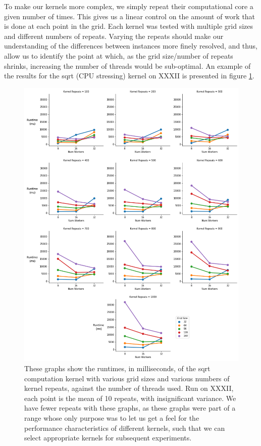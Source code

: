 To make our kernels more complex, we simply repeat their computational core a given number of times. This gives us a linear control on the amount of work that is done at each point in the grid. Each kernel was tested with multiple grid sizes and different numbers of repeats. Varying the repeats should make our understanding of the differences between instances more finely resolved, and thus, allow us to identify the point at which, as the grid size/number of repeats shrinks, increasing the number of threads would be sub-optimal. An example of the results for the sqrt (CPU stressing) kernel on XXXII is presented in figure \ref{fig:focustest3}.



\begin{figure}[H]
    \vspace*{-1.5in}
    \centerline{\includegraphics[width=1.3\textwidth]{graphics/interesting_instances/focustest3_2.png}}
    \caption{These graphs show the runtimes, in milliseconds, of the sqrt computation kernel with various grid sizes and various numbers of kernel repeats, against the number of threads used. Run on XXXII, each point is the mean of 10 repeats, with insignificant variance. We have fewer repeats with these graphs, as these graphs were part of a range whose only purpose was to let us get a feel for the performance characteristics of different kernels, such that we can select appropriate kernels for subsequent experiments.}
    \label{fig:focustest3}
\end{figure}



